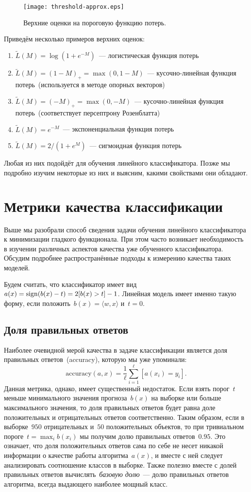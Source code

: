 \documentclass[12pt,fleqn]{article}
\begin{document}
\begin{figure}[t]
    \centering
    \texttt{[image: threshold-approx.eps]}
    \caption{Верхние оценки на пороговую функцию потерь.}
    \label{fig:bounds}
\end{figure}

Приведём несколько примеров верхних оценок:
\begin{enumerate}
    \item $\tilde L(M) = \log \left(1 + e^{-M} \right)$~--- логистическая функция потерь
    \item $\tilde L(M) = (1 - M)_+ = \max(0, 1 - M)$~--- кусочно-линейная функция потерь~(используется в методе опорных векторов)
    \item $\tilde L(M) = (-M)_+ = \max(0, -M)$~--- кусочно-линейная функция потерь~(соответствует персептрону Розенблатта)
    \item $\tilde L(M) = e^{-M}$~--- экспоненциальная функция потерь
    \item $\tilde L(M) = 2/(1 + e^M)$~--- сигмоидная функция потерь
\end{enumerate}
Любая из них подойдёт для обучения линейного классификатора.
Позже мы подробно изучим некоторые из них и выясним, какими свойствами они обладают.

\section{Метрики качества классификации}
Выше мы разобрали способ сведения задачи обучения линейного классификатора
к минимизации гладкого функционала.
При этом часто возникает необходимость в изучении различных аспектов качества
уже обученного классификатора.
Обсудим подробнее распространённые подходы к измерению качества таких моделей.

Будем считать, что классификатор имеет вид $a(x) = \mathop{\rm sign}\limits(b(x) - t) = 2 [b(x) > t] - 1$.
Линейная модель имеет именно такую форму, если положить~$b(x) = \langle w, x \rangle$ и~$t = 0$.

\subsection{Доля правильных ответов}
Наиболее очевидной мерой качества в задаче классификации является доля правильных ответов~(accuracy),
которую мы уже упоминали:
\[
    \text{accuracy}(a, x)
    =
    \frac{1}{\ell}
    \sum_{i = 1}^{\ell} [a(x_i) = y_i].
\]
Данная метрика, однако, имеет существенный недостаток.
Если взять порог~$t$ меньше минимального значения прогноза~$b(x)$ на выборке
или больше максимального значения, то доля правильных ответов будет равна
доле положительных и отрицательных ответов соответственно.
Таким образом, если в выборке~$950$ отрицательных
и~$50$ положительных объектов, то при тривиальном пороге~$t = \max_i b(x_i)$
мы получим долю правильных ответов~$0.95$.
Это означает, что доля положительных ответов сама по себе
не несет никакой информации о качестве работы алгоритма~$a(x)$,
и вместе с ней следует анализировать соотношение классов в выборке.
Также полезно вместе с долей правильных ответов вычислять~\emph{базовую долю}~---
долю правильных ответов алгоритма, всегда выдающего наиболее мощный класс.
\end{document}
